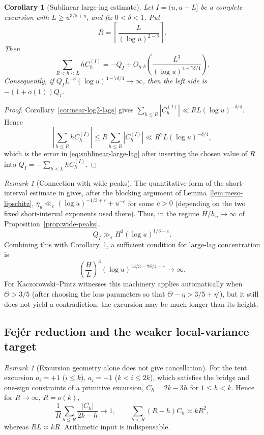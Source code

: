 \documentclass[11pt]{amsart}
\numberwithin{equation}{section}
\theoremstyle{plain}
\newtheorem{corollary}[theorem]{Corollary}
\theoremstyle{definition}
\theoremstyle{remark}
\newtheorem{remark}[theorem]{Remark}
\begin{document}
\begin{corollary}[Sublinear large-lag estimate]
\label{cor:sublinear-large-lag}
Let $I=(u,u+L]$ be a complete excursion with
$L\ge u^{3/5+\eta}$, and fix $0<\delta<1$. Put
\[
R=\left\lceil\frac{L}{(\log u)^{2-\delta}}\right\rceil.
\]
Then
\begin{equation}
\label{eq:sublinear-large-lag}
\sum_{R<h<L}hC_h^{(I)}
=-Q_I+O_{\eta,\delta}\!\left(
\frac{L^3}{(\log u)^{4-7\delta/4}}
\right).
\end{equation}
Consequently, if
$Q_I L^{-3}(\log u)^{4-7\delta/4}\to\infty$, then the left side is
$-(1+o(1))Q_I$.
\end{corollary}

\begin{proof}
Corollary~\ref{cor:near-log2-lags} gives
$\sum_{h\le R}|C_h^{(I)}|\ll RL(\log u)^{-\delta/4}$. Hence
\[
\left|\sum_{h\le R}hC_h^{(I)}\right|
\le R\sum_{h\le R}|C_h^{(I)}|
\ll R^2L(\log u)^{-\delta/4},
\]
which is the error in \eqref{eq:sublinear-large-lag} after inserting the
chosen value of $R$ into $Q_I=-\sum_{h<L}hC_h^{(I)}$.
\end{proof}

\begin{remark}[Connection with wide peaks]
\label{rem:sublinear-wide-peaks}
The quantitative form of the short-interval estimate in
\cite[Theorem~1.1]{MatomakiTeravainen2023} gives, after the blocking argument
of Lemma~\ref{lem:meso-lipschitz},
$\eta_u\ll_\varepsilon(\log u)^{-1/3+\varepsilon}+u^{-c}$ for some $c>0$
(depending on the two fixed short-interval exponents used there). Thus, in
the regime $H/h_u\to\infty$ of Proposition~\ref{prop:wide-peaks},
\[
Q_I\gg_\varepsilon H^3(\log u)^{1/3-\varepsilon}.
\]
Combining this with Corollary~\ref{cor:sublinear-large-lag}, a sufficient
condition for large-lag concentration is
\[
\left(\frac HL\right)^3
(\log u)^{13/3-7\delta/4-\varepsilon}\longrightarrow\infty.
\]
For Kaczorowski--Pintz witnesses this machinery applies automatically when
$\Theta>3/5$ (after choosing the loss parameters so that
$\Theta-\eta>3/5+\eta'$), but it still does not yield a contradiction: the
excursion may be much longer than its height.
\end{remark}

\subsection{Fej\'er reduction and the weaker local-variance target}

\begin{remark}[Excursion geometry alone does not give cancellation]
\label{rem:tent-chowla}
For the tent excursion $a_i=+1$ ($i\le k$), $a_i=-1$ ($k<i\le2k$), which
satisfies the bridge and one-sign constraints of a primitive excursion,
$C_h=2k-3h$ for $1\le h<k$. Hence for $R\to\infty$, $R=o(k)$,
\[
\frac1R\sum_{h\le R}\frac{|C_h|}{2k-h}\longrightarrow1,
\qquad
\sum_{h<R}(R-h)C_h\asymp kR^2,
\]
whereas $RL\asymp kR$. Arithmetic input is indispensable.
\end{remark}
\end{document}
